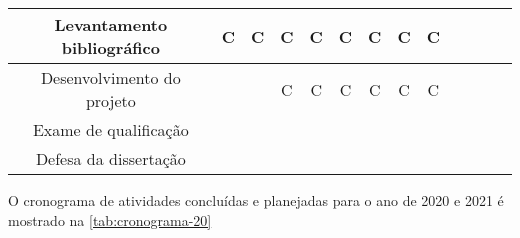 \begin{table}[htb]
{\begin{tabular}{|c|c|c|c|c|c|c|c|c|c|c|c|c|}
			\hline
			Levantamento bibliográfico
			& \cellcolor[HTML]{9AFF99}C
			& \cellcolor[HTML]{9AFF99}C
			& \cellcolor[HTML]{9AFF99}C
			& \cellcolor[HTML]{9AFF99}C
			& \cellcolor[HTML]{9AFF99}C
			& \cellcolor[HTML]{9AFF99}C
			& \cellcolor[HTML]{9AFF99}C
			& \cellcolor[HTML]{9AFF99}C \\
			
			\hline
			Desenvolvimento do projeto
			&
			&
			& \cellcolor[HTML]{9AFF99}C
			& \cellcolor[HTML]{9AFF99}C
			& \cellcolor[HTML]{9AFF99}C
			& \cellcolor[HTML]{9AFF99}C
			& \cellcolor[HTML]{9AFF99}C
			& \cellcolor[HTML]{9AFF99}C \\ 
			
			\hline
			Exame de qualificação
			&
			&
			&
			&
			&
			&
			&
			& \\
			
			\hline
			Defesa da dissertação
			&
			&
			&
			&
			&
			&
			&
			& \\
			\hline
			
		\end{tabular}}
	\end{table}

	O cronograma de atividades concluídas e planejadas para o ano de 2020 e 2021 é mostrado na \autoref{tab:cronograma-20}

